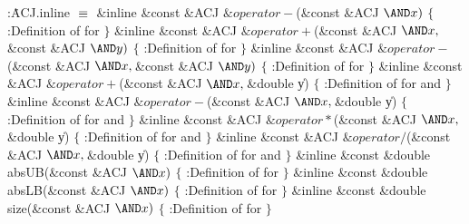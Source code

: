 \B{}:\.{ACJ.inline }\X${}\equiv{}$\6
\&{inline} \&{const} \&{ACJ} ${}\&{operator}{-}{}$(\&{const} \&{ACJ} ${}{\AND}%
\|x){}$\1\1\2\2\6
${}\{{}$\1\6
:Definition of  for \X\6
\4${}\}{}$\2\7
\&{inline} \&{const} \&{ACJ} ${}\&{operator}{+}{}$(\&{const} \&{ACJ} ${}{\AND}%
\|x,\39{}$\&{const} \&{ACJ} ${}{\AND}\|y){}$\1\1\2\2\6
${}\{{}$\1\6
:Definition of  for \X\6
\4${}\}{}$\2\7
\&{inline} \&{const} \&{ACJ} ${}\&{operator}{-}{}$(\&{const} \&{ACJ} ${}{\AND}%
\|x,\39{}$\&{const} \&{ACJ} ${}{\AND}\|y){}$\1\1\2\2\6
${}\{{}$\1\6
:Definition of  for \X\6
\4${}\}{}$\2\7
\&{inline} \&{const} \&{ACJ} ${}\&{operator}{+}{}$(\&{const} \&{ACJ} ${}{\AND}%
\|x,\39{}$\&{double} \|y)\1\1\2\2\6
${}\{{}$\1\6
:Definition of  for  and %
\X\6
\4${}\}{}$\2\7
\&{inline} \&{const} \&{ACJ} ${}\&{operator}{-}{}$(\&{const} \&{ACJ} ${}{\AND}%
\|x,\39{}$\&{double} \|y)\1\1\2\2\6
${}\{{}$\1\6
:Definition of  for  and %
\X\6
\4${}\}{}$\2\7
\&{inline} \&{const} \&{ACJ} ${}\&{operator}*{}$(\&{const} \&{ACJ} ${}{\AND}%
\|x,\39{}$\&{double} \|y)\1\1\2\2\6
${}\{{}$\1\6
:Definition of  for  and %
\X\6
\4${}\}{}$\2\7
\&{inline} \&{const} \&{ACJ} ${}\&{operator}{/}{}$(\&{const} \&{ACJ} ${}{\AND}%
\|x,\39{}$\&{double} \|y)\1\1\2\2\6
${}\{{}$\1\6
:Definition of  for  and %
\X\6
\4${}\}{}$\2\7
\&{inline} \&{const} \&{double} \\{absUB}(\&{const} \&{ACJ} ${}{\AND}\|x){}$\1%
\1\2\2\6
${}\{{}$\1\6
:Definition of  for \X\6
\4${}\}{}$\2\7
\&{inline} \&{const} \&{double} \\{absLB}(\&{const} \&{ACJ} ${}{\AND}\|x){}$\1%
\1\2\2\6
${}\{{}$\1\6
:Definition of  for \X\6
\4${}\}{}$\2\7
\&{inline} \&{const} \&{double} \\{size}(\&{const} \&{ACJ} ${}{\AND}\|x){}$\1\1%
\2\2\6
${}\{{}$\1\6
:Definition of  for \X\6
\4${}\}{}$\2\par
\fi

